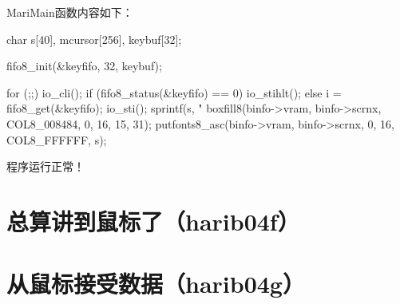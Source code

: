 MariMain函数内容如下：
\begin{code}
	char s[40], mcursor[256], keybuf[32];

	fifo8_init(&keyfifo, 32, keybuf);

	for (;;) {
		io_cli();
		if (fifo8_status(&keyfifo) == 0) {
			io_stihlt();
		} else {
			i = fifo8_get(&keyfifo);
			io_sti();
			sprintf(s, "%
			boxfill8(binfo->vram, binfo->scrnx, COL8_008484, 0, 16, 15, 31);
			putfonts8_asc(binfo->vram, binfo->scrnx, 0, 16, COL8_FFFFFF, s);
		}
	}
\end{code}

程序运行正常！
\section{	总算讲到鼠标了（harib04f）	}
\section{	从鼠标接受数据（harib04g）	}

